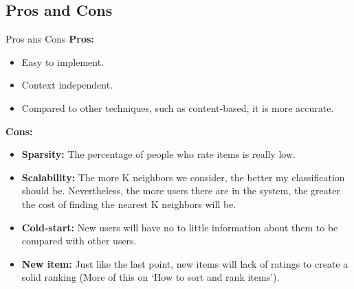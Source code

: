 \subsection{Pros and Cons}
\begin{frame}{Pros ans Cons}
    \textbf{Pros:}
    \begin{itemize}
        \item  Easy to implement.
        \item Context independent.
        \item Compared to other techniques, such as content-based, it is more accurate.
    \end{itemize}
    \textbf{Cons:}
    \begin{itemize}
        \item \textbf{Sparsity:} The percentage of people who rate items is really low.
        \item \textbf{Scalability:} The more K neighbors we consider, the better my classification should be. Nevertheless, the more users there are in the system, the greater the cost of finding the nearest K neighbors will be.
        \item \textbf{Cold-start:} New users will have no to little information about them to be compared with other users.
        \item \textbf{New item:} Just like the last point, new items will lack of ratings to create a solid ranking (More of this on ‘How to sort and rank items’).
    \end{itemize}
\end{frame}